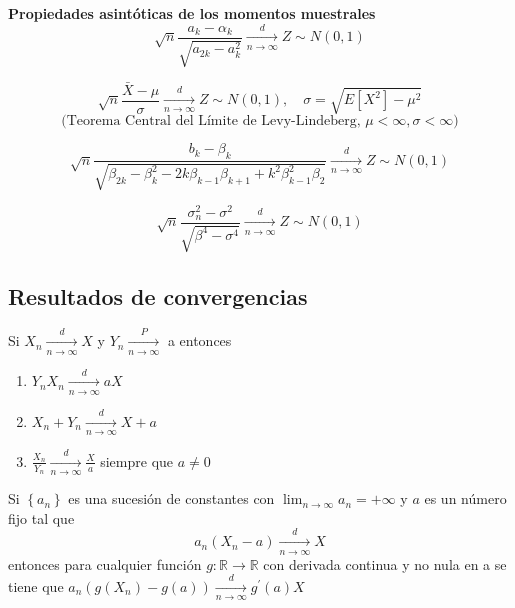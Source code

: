 \textbf{Propiedades asintóticas de los momentos muestrales}\\

\[
	\sqrt{n} \frac{a_k-\alpha_k}{\sqrt{a_{2k}-a_k^2}} \xrightarrow[n \rightarrow \infty]{d} Z \sim N(0,1)
\]

\[
	\sqrt{n} \frac{\bar{X}-\mu}{\sigma} \xrightarrow[n \rightarrow \infty]{d} Z \sim N(0,1), \quad \sigma=\sqrt{E\left[X^{2}\right]-\mu^{2}}
\]
\[
	\text{(Teorema Central del Límite de Levy-Lindeberg, } \mu<\infty, \sigma<\infty \text{)}
\]

\[
	\sqrt{n} \frac{b_{k}-\beta_{k}}{\sqrt{\beta_{2k}-\beta_{k}^{2}-2k \beta_{k-1} \beta_{k+1}+k^{2} \beta_{k-1}^{2} \beta_{2}}} \xrightarrow[n \rightarrow \infty]{d} Z \sim N(0,1)
\]

\[
	\sqrt{n} \frac{\sigma_n^2-\sigma^2}{\sqrt{\beta^4-\sigma^4}} \xrightarrow[n \rightarrow \infty]{d} Z \sim N(0,1)
\]

\subsection{Resultados de convergencias}

\begin{teorema}[de Slutsky]
	Si $X_{n} \xrightarrow[n \rightarrow \infty]{d} X$ y $Y_{n} \xrightarrow[n \rightarrow \infty]{P}$ a entonces
	\begin{enumerate}
		\item $Y_{n} X_{n} \xrightarrow[n \rightarrow \infty]{d} a X$
		\item $X_{n}+Y_{n} \xrightarrow[n \rightarrow \infty]{d} X+a$
		\item $\frac{X_{n}}{Y_{n}} \xrightarrow[n \rightarrow \infty]{d} \frac{X}{a}$ siempre que $a \neq 0$
	\end{enumerate}
\end{teorema}

\begin{lema}
	Si $\left\{a_{n}\right\}$ es una sucesión de constantes con $\lim _{n \rightarrow \infty} a_{n}=+\infty$ y $a$ es un número fijo tal que
	\[a_{n}\left(X_{n}-a\right) \xrightarrow[n \rightarrow \infty]{d} X\]
	entonces para cualquier función $g: \mathbb{R} \to \mathbb{R}$ con derivada
	continua y no nula en a se tiene que
	$a_{n}\left(g\left(X_{n}\right)-g(a)\right) \underset{n \rightarrow
			\infty}{\stackrel{d}{\longrightarrow}} g^{\prime}(a) X$
\end{lema}

\leavevmode

